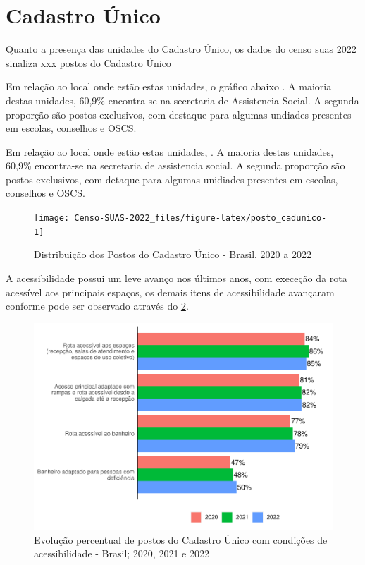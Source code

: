 \documentclass[
  brazilian]{report}
\begin{document}
\hypertarget{cadastro-uxfanico}{%
\section{Cadastro Único}\label{cadastro-uxfanico}}

Quanto a presença das unidades do Cadastro Único, os dados do censo suas
2022 sinaliza xxx postos do Cadastro Único

Em relação ao local onde estão estas unidades, o gráfico abaixo
. A maioria destas unidades, 60,9\% encontra-se
na secretaria de Assistencia Social. A segunda proporção são postos
exclusivos, com destaque para algumas undiades presentes em escolas,
conselhos e OSCS.

Em relação ao local onde estão estas unidades,
. A maioria destas unidades, 60,9\% encontra-se
na secretaria de assistencia social. A segunda proporção são postos
exclusivos, com detaque para algumas unidiades presentes em escolas,
conselhos e OSCS.

\begin{figure}
\texttt{[image: Censo-SUAS-2022\_files/figure-latex/posto\_cadunico-1]} \caption[Distribuição dos Postos do Cadastro Único - Brasil, 2020 a 2022]{Distribuição dos Postos do Cadastro Único - Brasil, 2020 a 2022}\label{fig:posto_cadunico}
\end{figure}

A acessibilidade possui um leve avanço nos últimos anos, com execeção da
rota acessível aos principais espaços, os demais itens de acessibilidade
avançaram conforme pode ser observado através do
\cref{fig:postcad-acessibilidade}.

\begin{figure}
\includegraphics{Censo-SUAS-2022_files/figure-latex/postcad-acessibilidade-1} \caption[Evolução percentual de postos do Cadastro Único com condições de acessibilidade - Brasil]{Evolução percentual de postos do Cadastro Único com condições de acessibilidade - Brasil; 2020, 2021 e 2022}\label{fig:postcad-acessibilidade}
\end{figure}
\end{document}
